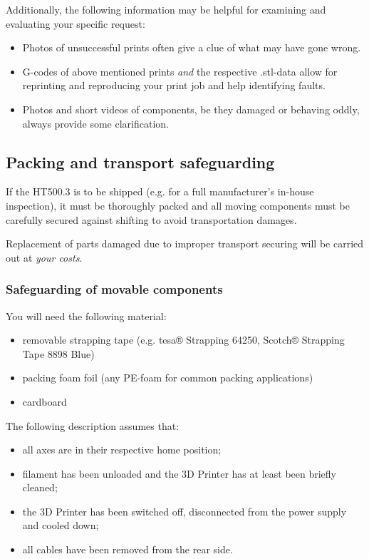 Additionally, the following information may be helpful for examining and evaluating your specific request:

\begin{itemize}
  \item Photos of unsuccessful prints often give a clue of what may have gone wrong.
  \item G-codes of above mentioned prints \emph{and} the respective .stl-data allow for reprinting and reproducing your print job and help 
        identifying faults.
  \item Photos and short videos of components, be they damaged or behaving oddly, always provide some clarification.
\end{itemize}



\subsection{Packing and transport safeguarding}

If the HT500.3 is to be shipped (e.g. for a full manufacturer's in-house inspection), it must be thoroughly packed and all moving components must be carefully secured against shifting to avoid transportation damages. 

\begin{info}
   Replacement of parts damaged due to improper transport securing will be carried out at \emph{your costs}. 
\end{info}


\subsubsection{Safeguarding of movable components}

 You will need the following material:

\begin{itemize}
  \item removable strapping tape
        (e.g. tesa® Strapping 64250, Scotch® Strapping Tape 8898 Blue)
  \item packing foam foil
        (any PE-foam for common packing applications)
  \item cardboard
\end{itemize}

The following description assumes that:

\begin{itemize}
  \item all axes are in their respective home position;
  \item filament has been unloaded and the 3D Printer has at least been briefly cleaned;
  \item the 3D Printer has been switched off, disconnected from the power supply and cooled down;
  \item all cables have been removed from the rear side.
\end{itemize}



